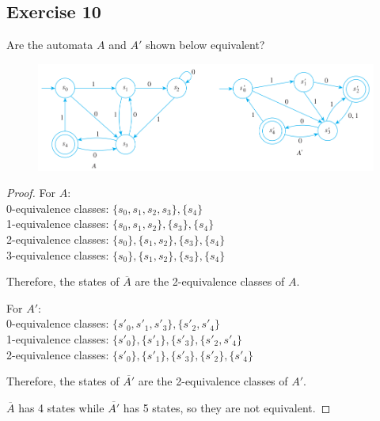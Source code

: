 \documentclass[14pt]{extarticle}
\begin{document}
\subsection{Exercise 10}
Are the automata \(A\) and \(A'\) shown below equivalent?

\begin{figure}[ht!]
\centering
\includegraphics[scale=0.5]{../images/12.3.10.png}
\end{figure}

\begin{proof}
For \(A\): \\
0-equivalence classes: \(\{s_0, s_1, s_2, s_3\}, \{s_4\}\) \\
1-equivalence classes: \(\{s_0, s_1, s_2\}, \{s_3\}, \{s_4\}\) \\
2-equivalence classes: \(\{s_0\}, \{s_1, s_2\}, \{s_3\}, \{s_4\}\) \\
3-equivalence classes: \(\{s_0\}, \{s_1, s_2\}, \{s_3\}, \{s_4\}\)

Therefore, the states of \(\overline{A}\) are the 2-equivalence classes of \(A\).

For \(A'\): \\
0-equivalence classes: \(\{s'_0, s'_1, s'_3\}, \{s'_2, s'_4\}\) \\
1-equivalence classes: \(\{s'_0\}, \{s'_1\}, \{s'_3\}, \{s'_2, s'_4\}\) \\
2-equivalence classes: \(\{s'_0\}, \{s'_1\}, \{s'_3\}, \{s'_2\}, \{s'_4\}\)

Therefore, the states of \(\overline{A'}\) are the 2-equivalence classes of \(A'\).

\(\overline{A}\) has 4 states while \(\overline{A'}\) has 5 states, so they are not equivalent.
\end{proof}
\end{document}

